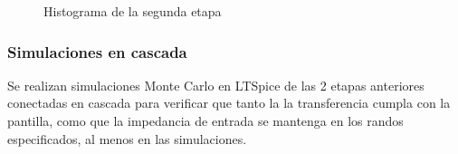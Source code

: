 \begin{figure}[H]
    \centering
    \caption{Histograma de la segunda etapa}
    \label{fig:2_HIST}
\end{figure}
\subsubsection{Simulaciones en cascada}
Se realizan simulaciones Monte Carlo en LTSpice de las 2 etapas anteriores conectadas en cascada para verificar que tanto la la transferencia cumpla con la pantilla, como que la impedancia de entrada se mantenga en los randos especificados, al menos en las simulaciones.

